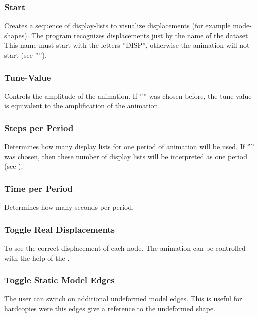 \documentclass{article}
\begin{document}
\subsubsection{\label{Start}Start}
Creates a sequence of display-lists to visualize displacements (for example mode-shapes). The program recognizes displacements just by the name of the dataset. This name must start with the letters ''DISP'', otherwise the animation will not start (see '''').

\subsubsection{\label{Tune-Value}Tune-Value}
Controls the amplitude of the animation. If '''' was chosen before, the tune-value is equivalent to the amplification of the animation. 

\subsubsection{\label{Steps per Period}Steps per Period}
Determines how many display lists for one period of animation will be used. If '''' was chosen, then these number of display lists will be interpreted as one period (see ).

\subsubsection{\label{Time per Period}Time per Period}
Determines how many seconds per period. 

\subsubsection{\label{Toggle Real Displacements}Toggle Real Displacements}
To see the correct displacement of each node. The animation can be controlled with the help of the .

\subsubsection{\label{Toggle Static Model Edges}Toggle Static Model Edges}
The user can switch on additional undeformed model edges. This is useful for hardcopies were this edges give a reference to the undeformed shape.
\end{document}
